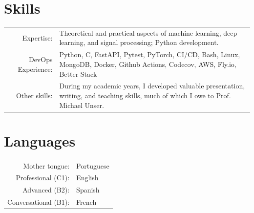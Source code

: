 \documentclass[a4paper,11pt]{article}
\begin{document}

    \vspace{18pt}

    \section{Skills}

    \begin{tabular}{rp{11cm}}
  	Expertise:  & Theoretical and practical aspects of machine learning, deep learning, and signal processing; Python development.
    \vspace{5pt}\\
  	DevOps Experience:       &  Python, C, FastAPI, Pytest, PyTorch, CI/CD, Bash, Linux, MongoDB, Docker, Github Actions, Codecov, AWS, Fly.io, Better Stack \vspace{5pt}\\
  	Other skills: 	   & During my academic years, I developed valuable presentation, writing, and teaching skills, much of which I owe to Prof. Michael Unser.
    \end{tabular}


    \vspace{18pt}

    \section{Languages}

      \begin{tabular}{rp{10cm}}

        Mother tongue: & Portuguese \\

        Professional (C1): & English \\

        Advanced (B2): & Spanish \\

        Conversational (B1): & French \\

      \end{tabular}
\end{document}
